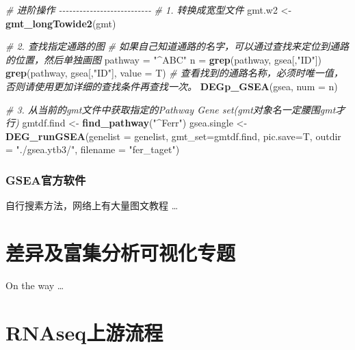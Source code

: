 \documentclass[
]{book}
\newenvironment{Shaded}{\begin{snugshade}}{\end{snugshade}}
\newcommand{\AttributeTok}[1]{\textcolor[rgb]{0.13,0.29,0.53}{#1}}
\newcommand{\CommentTok}[1]{\textcolor[rgb]{0.56,0.35,0.01}{\textit{#1}}}
\newcommand{\FunctionTok}[1]{\textcolor[rgb]{0.13,0.29,0.53}{\textbf{#1}}}
\newcommand{\NormalTok}[1]{#1}
\newcommand{\OtherTok}[1]{\textcolor[rgb]{0.56,0.35,0.01}{#1}}
\newcommand{\StringTok}[1]{\textcolor[rgb]{0.31,0.60,0.02}{#1}}
\begin{document}
\begin{Shaded}
\begin{Highlighting}[]
\CommentTok{\# 进阶操作 {-}{-}{-}{-}{-}{-}{-}{-}{-}{-}{-}{-}{-}{-}{-}{-}{-}{-}{-}{-}{-}{-}{-}{-}{-}{-}{-}}
\CommentTok{\# 1. 转换成宽型文件}
\NormalTok{gmt.w2 }\OtherTok{\textless{}{-}} \FunctionTok{gmt\_longTowide2}\NormalTok{(gmt) }

\CommentTok{\# 2. 查找指定通路的图}
\CommentTok{\#  如果自己知道通路的名字，可以通过查找来定位到通路的位置，然后单独画图}
\NormalTok{pathway }\OtherTok{=} \StringTok{"\^{}ABC"}
\NormalTok{n }\OtherTok{=} \FunctionTok{grep}\NormalTok{(pathway, gsea[,}\StringTok{"ID"}\NormalTok{])}
\FunctionTok{grep}\NormalTok{(pathway, gsea[,}\StringTok{"ID"}\NormalTok{], }\AttributeTok{value =}\NormalTok{ T) }\CommentTok{\# 查看找到的通路名称，必须时唯一值，否则请使用更加详细的查找条件再查找一次。}
\FunctionTok{DEGp\_GSEA}\NormalTok{(gsea, }\AttributeTok{num =}\NormalTok{ n)}

\CommentTok{\# 3. 从当前的gmt文件中获取指定的Pathway Gene set(gmt对象名一定腰围gmt才行)}
\NormalTok{gmtdf.find }\OtherTok{\textless{}{-}} \FunctionTok{find\_pathway}\NormalTok{(}\StringTok{"\^{}Ferr"}\NormalTok{)}
\NormalTok{gsea.single }\OtherTok{\textless{}{-}} \FunctionTok{DEG\_runGSEA}\NormalTok{(}\AttributeTok{genelist =}\NormalTok{ genelist, }\AttributeTok{gmt\_set=}\NormalTok{gmtdf.find, }
                           \AttributeTok{pic.save=}\NormalTok{T, }\AttributeTok{outdir =} \StringTok{"./gsea.ytb3/"}\NormalTok{, }
                           \AttributeTok{filename =} \StringTok{"fer\_taget"}\NormalTok{)}
\end{Highlighting}
\end{Shaded}

\subsection{GSEA官方软件}\label{gseaux5b98ux65b9ux8f6fux4ef6}

自行搜素方法，网络上有大量图文教程 \ldots{}

\chapter{差异及富集分析可视化专题}\label{visual}

On the way \ldots{}

\chapter{RNAseq上游流程}\label{rnaseq-rsubread}
\end{document}
